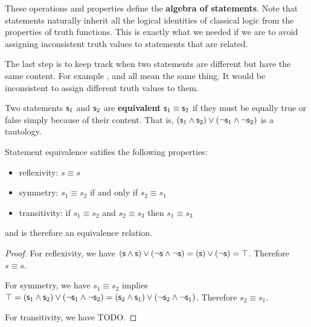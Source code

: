 \documentclass[11pt,letterpaper,fleqn]{memoir} %
\begin{document}
These operations and properties define the \textbf{algebra of statements}. Note that statements naturally inherit all the logical identities of classical logic from the properties of truth functions. This is exactly what we needed if we are to avoid assigning inconsistent truth values to statements that are related. 

The last step is to keep track when two statements are different but have the same content. For example ,  and  all mean the same thing. It would be inconsistent to assign different truth values to them.

\begin{mathSection}

\begin{defn}
	Two statements $\mathsf{s}_1$ and $\mathsf{s}_2$ are \textbf{equivalent} $\mathsf{s}_1 \equiv \mathsf{s}_2$ if they must be equally true or false simply because of their content. That is, $(\mathsf{s}_1 \wedge \mathsf{s}_2) \vee (\neg\mathsf{s}_1 \wedge \neg\mathsf{s}_2)$ is a tautology.
\end{defn}

\begin{prop}
	Statement equivalence satifies the following properties:
	\begin{itemize}
		\item reflexivity: $s \equiv s$
		\item symmetry: $s_1 \equiv s_2$ if and only if $s_2 \equiv s_1$
		\item transitivity: if $s_1 \equiv s_2$ and $s_2 \equiv s_3$ then $s_1 \equiv s_3$
	\end{itemize}
	and is therefore an equivalence relation.
\end{prop}
\begin{proof}
	For reflexivity, we have $(\mathsf{s} \wedge \mathsf{s}) \vee (\neg\mathsf{s} \wedge \neg\mathsf{s}) = (\mathsf{s}) \vee (\neg\mathsf{s}) = \top$. Therefore $s \equiv s$.
	
	For symmetry, we have $s_1 \equiv s_2$ implies $\top = (\mathsf{s}_1 \wedge \mathsf{s}_2) \vee (\neg\mathsf{s}_1 \wedge \neg\mathsf{s}_2) = (\mathsf{s}_2 \wedge \mathsf{s}_1) \vee (\neg\mathsf{s}_2 \wedge \neg\mathsf{s}_1)$. Therefore $s_2 \equiv s_1$.
	
	For transitivity, we have TODO.
\end{proof}

\end{mathSection}
\end{document}
